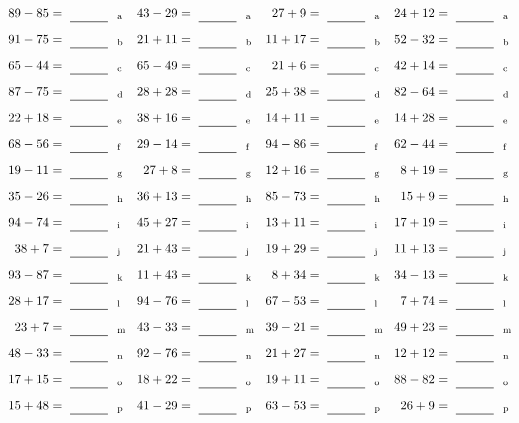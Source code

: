 \documentclass
[
  draft    = true,
  fontsize = 11pt,
  parskip  = half-
]
{scrartcl}
\begin{document}
\clearpage
\begin{align*}
    \pline{89-85}&=\rline{a}
  & \pline{43-29}&=\rline{a}
  & \pline{27+9}&=\rline{a}
  & \pline{24+12}&=\rline{a} \\[1ex]
    \pline{91-75}&=\rline{b}
  & \pline{21+11}&=\rline{b}
  & \pline{11+17}&=\rline{b}
  & \pline{52-32}&=\rline{b} \\[1ex]
    \pline{65-44}&=\rline{c}
  & \pline{65-49}&=\rline{c}
  & \pline{21+6}&=\rline{c}
  & \pline{42+14}&=\rline{c} \\[1ex]
    \pline{87-75}&=\rline{d}
  & \pline{28+28}&=\rline{d}
  & \pline{25+38}&=\rline{d}
  & \pline{82-64}&=\rline{d} \\[1ex]
    \pline{22+18}&=\rline{e}
  & \pline{38+16}&=\rline{e}
  & \pline{14+11}&=\rline{e}
  & \pline{14+28}&=\rline{e} \\[1ex]
    \pline{68-56}&=\rline{f}
  & \pline{29-14}&=\rline{f}
  & \pline{94-86}&=\rline{f}
  & \pline{62-44}&=\rline{f} \\[1ex]
    \pline{19-11}&=\rline{g}
  & \pline{27+8}&=\rline{g}
  & \pline{12+16}&=\rline{g}
  & \pline{8+19}&=\rline{g} \\[1ex]
    \pline{35-26}&=\rline{h}
  & \pline{36+13}&=\rline{h}
  & \pline{85-73}&=\rline{h}
  & \pline{15+9}&=\rline{h} \\[1ex]
    \pline{94-74}&=\rline{i}
  & \pline{45+27}&=\rline{i}
  & \pline{13+11}&=\rline{i}
  & \pline{17+19}&=\rline{i} \\[1ex]
    \pline{38+7}&=\rline{j}
  & \pline{21+43}&=\rline{j}
  & \pline{19+29}&=\rline{j}
  & \pline{11+13}&=\rline{j} \\[1ex]
    \pline{93-87}&=\rline{k}
  & \pline{11+43}&=\rline{k}
  & \pline{8+34}&=\rline{k}
  & \pline{34-13}&=\rline{k} \\[1ex]
    \pline{28+17}&=\rline{l}
  & \pline{94-76}&=\rline{l}
  & \pline{67-53}&=\rline{l}
  & \pline{7+74}&=\rline{l} \\[1ex]
    \pline{23+7}&=\rline{m}
  & \pline{43-33}&=\rline{m}
  & \pline{39-21}&=\rline{m}
  & \pline{49+23}&=\rline{m} \\[1ex]
    \pline{48-33}&=\rline{n}
  & \pline{92-76}&=\rline{n}
  & \pline{21+27}&=\rline{n}
  & \pline{12+12}&=\rline{n} \\[1ex]
    \pline{17+15}&=\rline{o}
  & \pline{18+22}&=\rline{o}
  & \pline{19+11}&=\rline{o}
  & \pline{88-82}&=\rline{o} \\[1ex]
    \pline{15+48}&=\rline{p}
  & \pline{41-29}&=\rline{p}
  & \pline{63-53}&=\rline{p}
  & \pline{26+9}&=\rline{p}
\end{align*}
\end{document}
